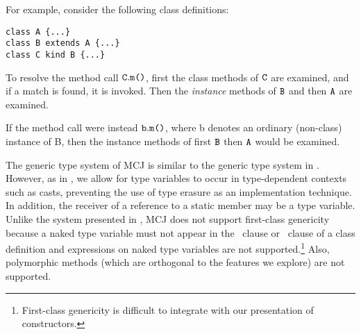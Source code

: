 \documentclass[nocopyrightspace,10pt]{acm-sigplan}
\begin{document}
For example, consider the following class definitions:

\begin{verbatim}
class A {...}
class B extends A {...}
class C kind B {...}
\end{verbatim}

To resolve the method call ${\mathtt{{C}}}{\mathtt .}{\mbox {\tt m}\mbox{\tt (}{\overline{{}}}\mbox{\tt )}}$, first the class
methods of $\mathtt{{C}}$ are examined, and if a match is found, it is invoked.
Then the \emph{instance} methods of $\mbox {\tt B}$ and then $\mbox {\tt A}$ are examined.

If the method call were instead ${\mbox {\tt b}}{\mathtt .}{\mbox {\tt m}\mbox{\tt (}{\overline{{}}}\mbox{\tt )}}$, where {\txt
b} denotes an ordinary (non-class) instance of {\txt B}, then the
instance methods of first $\mbox {\tt B}$ then $\mbox {\tt A}$ would be examined.






The generic type system of MCJ is similar to the generic type system
in \FGJ. However, as in \cite{NextGen, DimUnits}, we allow for type
variables to occur in type-dependent contexts such as casts,
preventing the use of type erasure as an implementation technique. In
addition, the receiver of a reference to a static member may be a type
variable. Unlike the system presented in \cite{MixGen}, MCJ does not
support first-class genericity because a naked type variable must not
appear in the \extends\ clause or \kind\ clause of a class definition
and {} expressions on naked type variables are not
supported.\footnote{First-class genericity is difficult to integrate
with our presentation of constructors.} Also, polymorphic methods
(which are orthogonal to the features we explore) are not supported.
\end{document}
